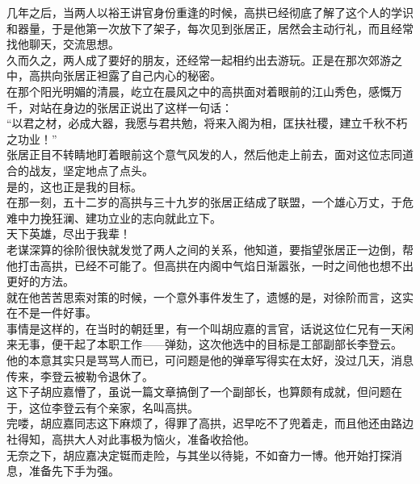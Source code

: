 \begin{multicols}{\theparacolNo}
几年之后，当两人以裕王讲官身份重逢的时候，高拱已经彻底了解了这个人的学识和器量，于是他第一次放下了架子，每次见到张居正，居然会主动行礼，而且经常找他聊天，交流思想。\\

久而久之，两人成了要好的朋友，还经常一起相约出去游玩。正是在那次郊游之中，高拱向张居正袒露了自己内心的秘密。\\

在那个阳光明媚的清晨，屹立在晨风之中的高拱面对着眼前的江山秀色，感慨万千，对站在身边的张居正说出了这样一句话：\\

“以君之材，必成大器，我愿与君共勉，将来入阁为相，匡扶社稷，建立千秋不朽之功业！”\\

张居正目不转睛地盯着眼前这个意气风发的人，然后他走上前去，面对这位志同道合的战友，坚定地点了点头。\\

是的，这也正是我的目标。\\

在那一刻，五十二岁的高拱与三十九岁的张居正结成了联盟，一个雄心万丈，于危难中力挽狂澜、建功立业的志向就此立下。\\

天下英雄，尽出于我辈！\\

老谋深算的徐阶很快就发觉了两人之间的关系，他知道，要指望张居正一边倒，帮他打击高拱，已经不可能了。但高拱在内阁中气焰日渐嚣张，一时之间他也想不出更好的方法。\\

就在他苦苦思索对策的时候，一个意外事件发生了，遗憾的是，对徐阶而言，这实在不是一件好事。\\

事情是这样的，在当时的朝廷里，有一个叫胡应嘉的言官，话说这位仁兄有一天闲来无事，便干起了本职工作——弹劾，这次他选中的目标是工部副部长李登云。\\

他的本意其实只是骂骂人而已，可问题是他的弹章写得实在太好，没过几天，消息传来，李登云被勒令退休了。\\

这下子胡应嘉懵了，虽说一篇文章搞倒了一个副部长，也算颇有成就，但问题在于，这位李登云有个亲家，名叫高拱。\\

完喽，胡应嘉同志这下麻烦了，得罪了高拱，迟早吃不了兜着走，而且他还由路边社得知，高拱大人对此事极为恼火，准备收拾他。\\

无奈之下，胡应嘉决定铤而走险，与其坐以待毙，不如奋力一博。他开始打探消息，准备先下手为强。\\


\end{multicols}
